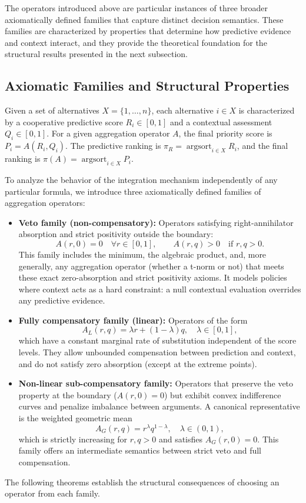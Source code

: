 \documentclass[mathematics,article,submit,moreauthors]{Definitions/mdpi}
\begin{document}
{\color{red}
The operators introduced above are particular instances of three broader axiomatically defined families that capture distinct decision semantics. These families are characterized by properties that determine how predictive evidence and context interact, and they provide the theoretical foundation for the structural results presented in the next subsection.
}

{\color{red}
\subsection{Axiomatic Families and Structural Properties}
\label{subsect:rank_properties}


Given a set of alternatives $X=\{1,\dots,n\}$, each alternative $i\in X$ is characterized by a cooperative predictive score $R_i\in[0,1]$ and a contextual assessment $Q_i\in[0,1]$. For a given aggregation operator $A$, the final priority score is $P_i=A(R_i,Q_i)$. The predictive ranking is $\pi_R=\operatorname{argsort}_{i\in X}R_i$, and the final ranking is $\pi(A)=\operatorname{argsort}_{i\in X}P_i$.

To analyze the behavior of the integration mechanism independently of any particular formula, we introduce three axiomatically defined families of aggregation operators:

\begin{itemize}
\item \textbf{Veto family (non-compensatory):} Operators satisfying right-annihilator absorption and strict positivity outside the boundary:
\[
A(r,0)=0 \quad \forall r\in[0,1], \qquad A(r,q)>0 \quad \text{if } r,q>0.
\]
This family includes the minimum, the algebraic product, and, more generally, any aggregation operator (whether a t-norm or not) that meets these exact zero-absorption and strict positivity axioms. It models policies where context acts as a hard constraint: a null contextual evaluation overrides any predictive evidence.

\item \textbf{Fully compensatory family (linear):} Operators of the form
\[
A_L(r,q)=\lambda r+(1-\lambda)q,\quad \lambda\in[0,1],
\]
which have a constant marginal rate of substitution independent of the score levels. They allow unbounded compensation between prediction and context, and do not satisfy zero absorption (except at the extreme points).

\item \textbf{Non-linear sub-compensatory family:} Operators that preserve the veto property at the boundary ($A(r,0)=0$) but exhibit convex indifference curves and penalize imbalance between arguments. A canonical representative is the weighted geometric mean
{\color{red}
\[
A_G(r,q)=r^{\lambda}q^{1-\lambda},\quad \lambda\in(0,1),
\]
}
which is strictly increasing for $r,q>0$ and satisfies $A_G(r,0)=0$. This family offers an intermediate semantics between strict veto and full compensation.
\end{itemize}

The following theorems establish the structural consequences of choosing an operator from each family.
}
\end{document}
